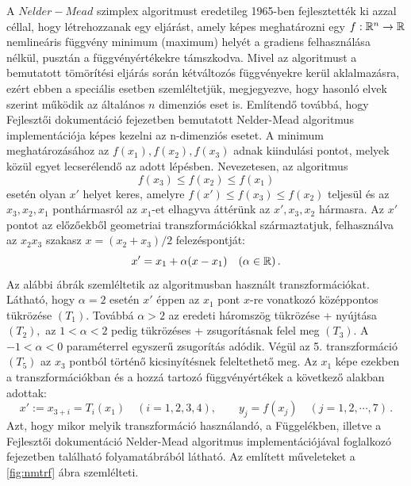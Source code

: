 \documentclass[oneside,titlepage,12pt,a4paper]{report}
\begin{document}
A $Nelder-Mead$ szimplex algoritmust \cite{} eredetileg 1965-ben
fejlesztették ki azzal céllal, hogy létrehozzanak egy eljárást, amely
képes meghatározni egy $f : \Bbb R^n \to \Bbb R$ nemlineáris függvény minimum (maximum) helyét a  gradiens felhasználása  nélkül,
 pusztán a függvényértékekre  támszkodva. 
Mivel az algoritmust a bemutatott tömörítési eljárás során kétváltozós függvényekre kerül aklalmazásra, ezért ebben a speciális esetben szemléltetjük, megjegyezve, hogy hasonló 
elvek szerint
 működik az általános $n$ dimenziós eset is. Említendő továbbá, hogy Fejlesztői dokumentáció fejezetben bemutatott Nelder-Mead algoritmus implementációja képes kezelni az n-dimenziós esetet.  A minimum meghatározásához az $f(x_1), f(x_2), f(x_3)$  adnak kiindulási pontot, melyek közül egyet lecserélendő az adott lépésben. Nevezetesen, az algoritmus
\begin{equation*}
f(x_3)\le f(x_2)\le f(x_1)
\end{equation*}
 esetén olyan $x'$ helyet keres, amelyre $f(x')\le  f(x_3)\le f(x_2)$ teljesül és az $x_3, x_2, x_1$ ponthármasról az $x_1$-et elhagyva áttérünk az $x',x_3, x_2$ hármasra. Az $x'$ pontot az előzőekből geometriai transzformációkkal származtatjuk, felhasználva az  $x_2x_3$ szakasz $x=(x_2+x_3)/2$ felezéspontját: 
\begin{equation*}
x'=x_1+\alpha (x-x_1) \quad (\alpha\in\Bbb R)\,.
\end{equation*}
 Az alábbi ábrák szemléltetik az algoritmusban  használt transzformációkat. Látható, hogy $\alpha=2$ esetén $x'$ éppen az $x_1$ pont $x$-re vonatkozó középpontos tükrözése $(T_1).$ Továbbá $\alpha>2$ az eredeti háromszög tükrözése + nyújtása $(T_2),$ az $1<\alpha<2$ pedig tükrözéses + zsugorításnak felel meg $(T_3).$ A $-1<\alpha<0$ paraméterrel egyszerű zsugorítás adódik. Végül az 5. transzformáció $(T_5)$ az $x_3$ pontból történő
 kicsinyítésnek feleltethető meg. Az $x_1$ képe ezekben a transzformációkban és a hozzá tartozó függvényértékek a következő alakban adottak:
\begin{equation*}
x':=x_{3+i}=T_i(x_1)\quad (i=1,2,3,4), \qquad y_j=f(x_j)\quad (j=1,2,\cdots,7)\,.
\end{equation*}
Azt, hogy mikor melyik transzformáció használandó, a Függelékben, illetve a Fejlesztői dokumentáció Nelder-Mead algoritmus implementációjával foglalkozó fejezetben
található  folyamatábrából látható. Az említett műveleteket a \ref{fig:nmtrf} ábra szemlélteti.
\end{document}
